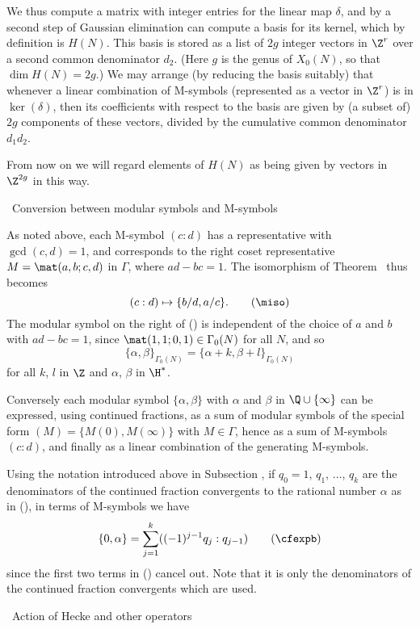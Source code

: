 We thus compute a matrix with integer entries for the linear map $\delta$, 
and by a second step of Gaussian elimination can compute a basis for its 
kernel, which by definition is $H(N)$.   This basis is stored as a list of 
$2g$ integer vectors in $\Z^r$ over a second common denominator $d_2$. 
(Here $g$ is the genus of $X_0(N)$, so that $\dim H(N)=2g$.) We may arrange 
(by reducing the basis suitably) that whenever a linear combination of 
M-symbols (represented as a vector in $\Z^r$) is in $\ker(\delta)$,  then 
its coefficients with respect to the basis are given by (a subset of) $2g$ 
components of these vectors, divided by the cumulative common denominator 
$d_1d_2$.

From now on we will regard elements of $H(N)$ as being given by 
vectors in $\Z^{2g}$ in this way.

%
%
\beginsection{\Convert}
\head\Convert\ Conversion between modular symbols and M-symbols\endhead

As noted above, each M-symbol $(c:d)$ has a representative with
$\gcd(c,d)=1$, and corresponds to the right coset representative
$M=\mat(a,b;c,d)$ in $\Gamma$, where $ad-bc=1$.   The isomorphism of
Theorem \ManinThm\ thus becomes \neweq{\miso}
$$
  (c:d) \mapsto \{b/d,a/c\}.                           \tag \miso
$$
The modular symbol on the right of (\miso) is independent of the choice of
$a$ and $b$ with $ad-bc=1$, since $\mat(1,1;0,1)\in\Gamma_0(N)$ for all
$N$, and so
$$
  \{\alpha,\beta\}_{\Gamma_0(N)} = \{\alpha+k,\beta+l\}_{\Gamma_0(N)}
$$
for all $k$, $l$ in $\Z$ and $\alpha$, $\beta$ in $\H^*$.

Conversely each modular symbol $\{\alpha,\beta\}$ with $\alpha$ and
$\beta$ in $\Q\cup\{\infty\}$ can be expressed, using continued
fractions, as a sum of modular symbols of the special form
$(M)=\{M(0),M(\infty)\}$ with $M\in\Gamma$, hence as a sum of
M-symbols $(c:d)$, and finally as a linear combination of the
generating M-symbols.

Using the notation introduced above in Subsection \triangles, if
$q_0=1$, $q_1$, $\ldots$, $q_k$ are the denominators of the continued
fraction convergents to the rational number $\alpha$ as in (\cfconv),
in terms of M-symbols we have \neweq\cfexpb
$$
   \{0,\alpha\} =  \sum_{j=1}^{k}((-1)^{j-1}q_j : q_{j-1}) \tag\cfexpb
$$
since the first two terms in (\cfexpa) cancel out.  Note that it is
only the denominators of the continued fraction convergents which are
used.


%
%
\beginsection{\Hecke}
\head\Hecke\ Action of Hecke and other operators\endhead

